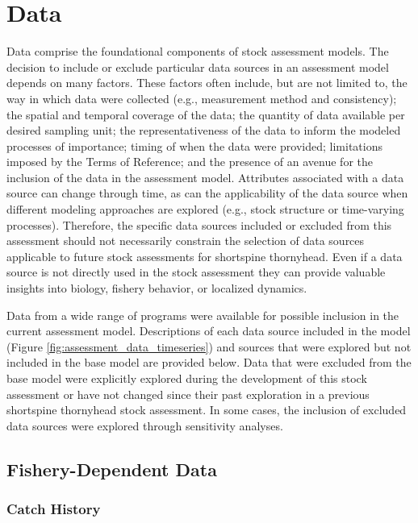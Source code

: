 \documentclass[11pt,
  english,
  letterpaper,
]{article}
\begin{document}
\hypertarget{data}{%
\section{Data}\label{data}}

Data comprise the foundational components of stock assessment models. The decision to include or exclude particular data sources in an assessment model depends on many factors. These factors often include, but are not limited to, the way in which data were collected (e.g., measurement method and consistency); the spatial and temporal coverage of the data; the quantity of data available per desired sampling unit; the representativeness of the data to inform the modeled processes of importance; timing of when the data were provided; limitations imposed by the Terms of Reference; and the presence of an avenue for the inclusion of the data in the assessment model. Attributes associated with a data source can change through time, as can the applicability of the data source when different modeling approaches are explored (e.g., stock structure or time-varying processes). Therefore, the specific data sources included or excluded from this assessment should not necessarily constrain the selection of data sources applicable to future stock assessments for shortspine thornyhead. Even if a data source is not directly used in the stock assessment they can provide valuable insights into biology, fishery behavior, or localized dynamics.

Data from a wide range of programs were available for possible inclusion in the current assessment model. Descriptions of each data source included in the model (Figure \ref{fig:assessment_data_timeseries}) and sources that were explored but not included in the base model are provided below. Data that were excluded from the base model were explicitly explored during the development of this stock assessment or have not changed since their past exploration in a previous shortspine thornyhead stock assessment. In some cases, the inclusion of excluded data sources were explored through sensitivity analyses.

\hypertarget{fishery-dependent-data}{%
\subsection{Fishery-Dependent Data}\label{fishery-dependent-data}}

\hypertarget{catch-history}{%
\subsubsection{Catch History}\label{catch-history}}
\end{document}
